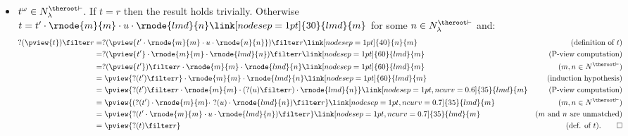 \begin{itemize}
\item $t^\omega \in N^{\theroot\vdash}_\lambda$. If $t=r$ then the result holds trivially.
Otherwise $t =  t' \cdot \rnode{m}{m} \cdot u \cdot
\rnode{lmd}{n} \link[nodesep=1pt]{30}{lmd}{m}$ for some $n\in
    N^{\theroot \vdash}_\lambda$ and:
        \begin{align*}
        ?(\pview{t}) \filter  r
        &= ?(\pview{t' \cdot \rnode{m}{m} \cdot u \cdot \rnode{n}{n}}) \filter  r
               \link[nodesep=1pt]{40}{n}{m}                   & (\mbox{definition of } t)\\
        &= ?(\pview{t'} \cdot \rnode{m}{m} \cdot  \rnode{lmd}{n} ) \filter  r
               \link[nodesep=1pt]{60}{lmd}{m}                 & (\mbox{P-view computation}) \\
        &= ?(\pview{t'}) \filter  r \cdot \rnode{m}{m} \cdot  \rnode{lmd}{n}
               \link[nodesep=1pt]{60}{lmd}{m}                 & (m, n \in N^{\theroot \vdash}) \\
        &= \pview{?(t')\filter r}  \cdot \rnode{m}{m} \cdot  \rnode{lmd}{n}
               \link[nodesep=1pt]{60}{lmd}{m}                 & \mbox{(induction hypothesis)} \\
        &= \pview{ ?(t') \filter r \cdot \rnode{m}{m} \cdot (?(u) \filter r) \cdot \rnode{lmd}{n}}
\link[nodesep=1pt,ncurv=0.6]{35}{lmd}{m}                                                          & (\mbox{P-view computation}) \\
        &= \pview{ (?(t') \cdot \rnode{m}{m} \cdot\ ?(u) \cdot \rnode{lmd}{n}) \filter r }
\link[nodesep=1pt,ncurv=0.7]{35}{lmd}{m}                                                          & (m, n \in N^{\theroot \vdash}) \\
        &= \pview{ ?(t' \cdot \rnode{m}{m} \cdot u \cdot \rnode{lmd}{n}) \filter r }
\link[nodesep=1pt,ncurv=0.7]{35}{lmd}{m}                                                          & \mbox{($m$ and $n$ are unmatched)} \\
        &= \pview{ ?(t) \filter r }                & \mbox{(def. of $t$).} \qed
        \end{align*}
\end{itemize}
